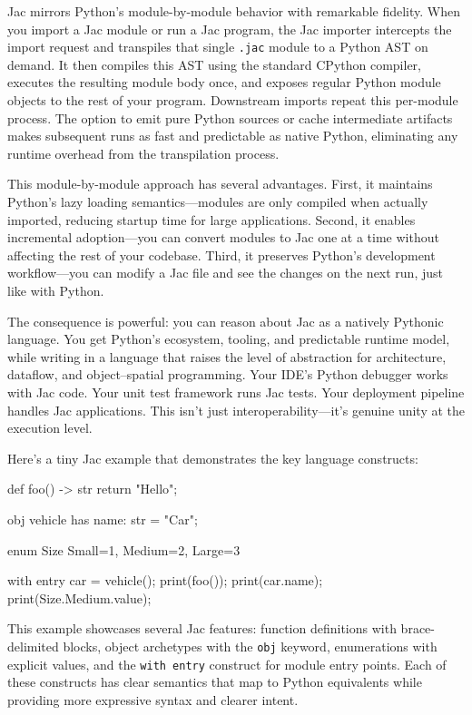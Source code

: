 Jac mirrors Python's module-by-module behavior with remarkable fidelity. When you import a Jac module or run a Jac program, the Jac importer intercepts the import request and transpiles that single \texttt{.jac} module to a Python AST on demand. It then compiles this AST using the standard CPython compiler, executes the resulting module body once, and exposes regular Python module objects to the rest of your program. Downstream imports repeat this per-module process. The option to emit pure Python sources or cache intermediate artifacts makes subsequent runs as fast and predictable as native Python, eliminating any runtime overhead from the transpilation process.

This module-by-module approach has several advantages. First, it maintains Python's lazy loading semantics—modules are only compiled when actually imported, reducing startup time for large applications. Second, it enables incremental adoption—you can convert modules to Jac one at a time without affecting the rest of your codebase. Third, it preserves Python's development workflow—you can modify a Jac file and see the changes on the next run, just like with Python.

The consequence is powerful: you can reason about Jac as a natively Pythonic language. You get Python's ecosystem, tooling, and predictable runtime model, while writing in a language that raises the level of abstraction for architecture, dataflow, and object–spatial programming. Your IDE's Python debugger works with Jac code. Your unit test framework runs Jac tests. Your deployment pipeline handles Jac applications. This isn't just interoperability—it's genuine unity at the execution level.

Here's a tiny Jac example that demonstrates the key language constructs:

\begin{jacblock}
def foo() -> str {
    return "Hello";
}

obj vehicle {
    has name: str = "Car";
}

enum Size {
    Small=1, Medium=2, Large=3
}

with entry {
    car = vehicle();
    print(foo());
    print(car.name);
    print(Size.Medium.value);
}
\end{jacblock}

This example showcases several Jac features: function definitions with brace-delimited blocks, object archetypes with the \texttt{obj} keyword, enumerations with explicit values, and the \texttt{with entry} construct for module entry points. Each of these constructs has clear semantics that map to Python equivalents while providing more expressive syntax and clearer intent.

